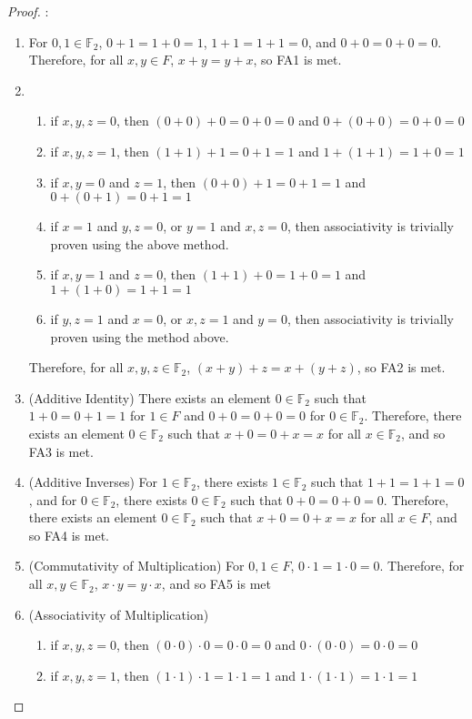 \documentclass[openany, amssymb, psamsfonts]{amsart}
\newcommand{\bbF}{\mathbb{F}}
\theoremstyle{definition}
\numberwithin{equation}{section}
\begin{document}
\begin{proof}:		
	\begin{enumerate}[1]
		\item  For $0,1\in \bbF_{2}$, $0 + 1 = 1 + 0 = 1$, $1+1 = 1+1 = 0$, and $0+0=0+0=0$. Therefore, for all $x,y\in F$, $x + y = y + x$, so FA1 is met.
 \item \begin{enumerate}
      \item if $x,y,z =0$, then $(0+0) +0 = 0+0 = 0$ and $0+(0+0) = 0+0 =0$
      \item if $x,y,z =1$, then $(1+1) +1 = 0+1 = 1$ and $1+(1+1) = 1+0 =1$
      \item if $x,y = 0$ and $z=1$, then $(0+0) +1 = 0+1 = 1$ and $0+(0+1) = 0+1 =1$
      \item if $x =1$ and $y,z=0$, or $y=1$ and $x,z = 0$, then associativity is trivially proven using the above method.
      \item if $x,y =1$ and $z=0$, then $(1+1)+0 = 1+0 = 1$ and $1+(1+0) = 1+1 = 1$
      \item if $y,z =1$ and $x=0$, or $x,z=1$ and $y=0$, then associativity is trivially proven using the method above.
  \end{enumerate}
 Therefore, for all $x,y,z\in \bbF_2$, $(x + y) + z = x + (y + z)$, so FA2 is met.
		\item  (Additive Identity)  There exists an element $0 \in \bbF_2$ such that $1 + 0 = 0 + 1 = 1$ for $1 \in F$ and $0 + 0 = 0 + 0 = 0$ for $0 \in \bbF_2$. Therefore, there exists an element $0 \in \bbF_2$ such that $x + 0 = 0 + x = x$ for all $x \in \bbF_2$, and so FA3 is met.
		\item  (Additive Inverses)  For $1 \in \bbF_2$, there exists $1 \in \bbF_2$ such that $1 + 1 = 1 + 1 = 0$, and for $0 \in \bbF_2$, there exists $0 \in \bbF_2$ such that $0 + 0 = 0 + 0 = 0$. Therefore, there exists an element $0 \in \bbF_2$ such that $x + 0 = 0 + x = x$ for all $x \in F$, and so FA4 is met.
		\item  (Commutativity of Multiplication)  For $0,1\in F$, $0 \cdot 1 = 1 \cdot 0 = 0$. Therefore, for all $x,y\in \bbF_2$, $x \cdot y = y \cdot x$, and so FA5 is met
		\item  (Associativity of Multiplication)  
  \begin{enumerate}
      \item if $x,y,z =0$, then $(0\cdot 0) \cdot 0 = 0 \cdot 0 = 0$ and $0\cdot(0 \cdot0) = 0\cdot0 =0$
      \item if $x,y,z =1$, then $(1\cdot1) \cdot1 = 1\cdot1 = 1$ and $1\cdot(1\cdot1) = 1\cdot1 =1$

\end{enumerate}
\end{enumerate}
\end{proof}
\end{document}
